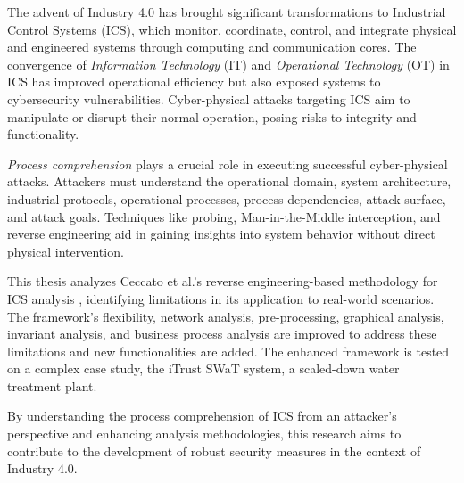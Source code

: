 \newenvironment{abstract}%
{\cleardoublepage\fncyblank\null\vfill\begin{center}%
		\bfseries\Large\abstractname\end{center}}%
{\vfill\null}

\begin{titlepage}
	\begin{abstract}
		
		
		The advent of Industry 4.0 has brought significant transformations to Industrial Control Systems (ICS), which monitor, coordinate, control, and integrate physical and engineered systems through computing and communication cores. The convergence of \textit{Information Technology} (IT) and \textit{Operational Technology} (OT) in ICS has improved operational efficiency but also exposed systems to cybersecurity vulnerabilities. Cyber-physical attacks targeting ICS aim to manipulate or disrupt their normal operation, posing risks to integrity and functionality.
		
		\textit{Process comprehension} plays a crucial role in executing successful cyber-physical attacks. Attackers must understand the operational domain, system architecture, industrial protocols, operational processes, process dependencies, attack surface, and attack goals. Techniques like probing, Man-in-the-Middle interception, and reverse engineering aid in gaining insights into system behavior without direct physical intervention.
		
		This thesis analyzes Ceccato et al.'s reverse engineering-based methodology for ICS analysis \cite{ceccato}, identifying limitations in its application to real-world scenarios. The framework's flexibility, network analysis, pre-processing, graphical analysis, invariant analysis, and business process analysis are improved to address these limitations and new functionalities are added. The enhanced framework is tested on a complex case study, the iTrust SWaT system, a scaled-down water treatment plant.
		
		By understanding the process comprehension of ICS from an attacker's perspective and enhancing analysis methodologies, this research aims to contribute to the development of robust security measures in the context of Industry 4.0.
		
	\end{abstract}
	\vfill
\end{titlepage}
\thispagestyle{empty}
